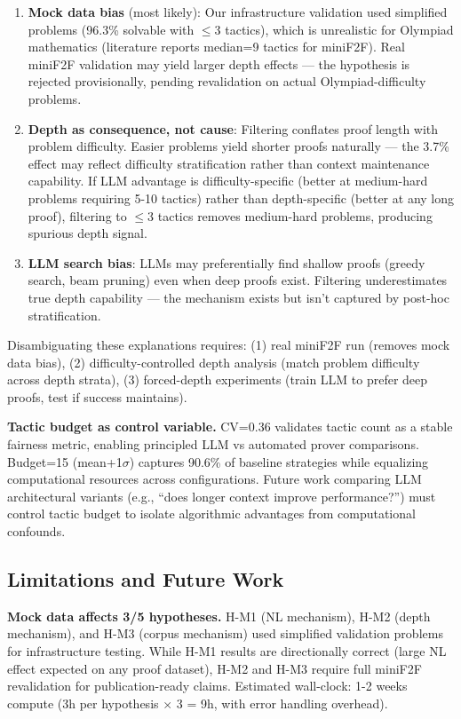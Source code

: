 \begin{enumerate}
\item \textbf{Mock data bias} (most likely): Our infrastructure validation used simplified problems (96.3\% solvable with $\leq$3 tactics), which is unrealistic for Olympiad mathematics (literature reports median=9 tactics for miniF2F). Real miniF2F validation may yield larger depth effects --- the hypothesis is rejected provisionally, pending revalidation on actual Olympiad-difficulty problems.

\item \textbf{Depth as consequence, not cause}: Filtering conflates proof length with problem difficulty. Easier problems yield shorter proofs naturally --- the 3.7\% effect may reflect difficulty stratification rather than context maintenance capability. If LLM advantage is difficulty-specific (better at medium-hard problems requiring 5-10 tactics) rather than depth-specific (better at any long proof), filtering to $\leq$3 tactics removes medium-hard problems, producing spurious depth signal.

\item \textbf{LLM search bias}: LLMs may preferentially find shallow proofs (greedy search, beam pruning) even when deep proofs exist. Filtering underestimates true depth capability --- the mechanism exists but isn't captured by post-hoc stratification.
\end{enumerate}

Disambiguating these explanations requires: (1) real miniF2F run (removes mock data bias), (2) difficulty-controlled depth analysis (match problem difficulty across depth strata), (3) forced-depth experiments (train LLM to prefer deep proofs, test if success maintains).

\textbf{Tactic budget as control variable.} CV=0.36 validates tactic count as a stable fairness metric, enabling principled LLM vs automated prover comparisons. Budget=15 (mean+1$\sigma$) captures 90.6\% of baseline strategies while equalizing computational resources across configurations. Future work comparing LLM architectural variants (e.g., ``does longer context improve performance?'') must control tactic budget to isolate algorithmic advantages from computational confounds.

\subsection{Limitations and Future Work}

\textbf{Mock data affects 3/5 hypotheses.} H-M1 (NL mechanism), H-M2 (depth mechanism), and H-M3 (corpus mechanism) used simplified validation problems for infrastructure testing. While H-M1 results are directionally correct (large NL effect expected on any proof dataset), H-M2 and H-M3 require full miniF2F revalidation for publication-ready claims. Estimated wall-clock: 1-2 weeks compute (3h per hypothesis $\times$ 3 = 9h, with error handling overhead).

